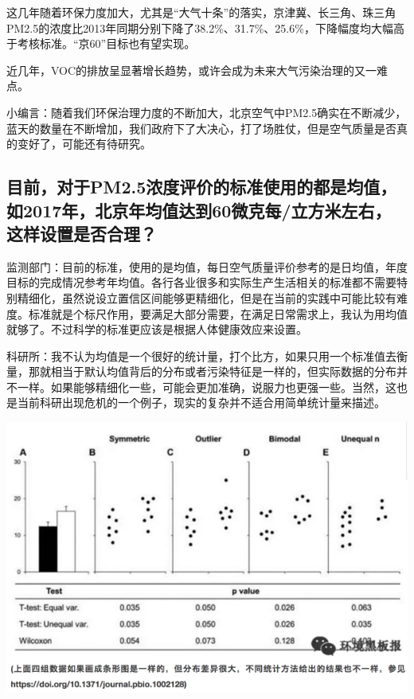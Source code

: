 \documentclass[]{book}
\begin{document}
这几年随着环保力度加大，尤其是``大气十条''的落实，京津冀、长三角、珠三角PM2.5的浓度比2013年同期分别下降了38.2\%、31.7\%、25.6\%，下降幅度均大幅高于考核标准。``京60''目标也有望实现。

近几年，VOC的排放呈显著增长趋势，或许会成为未来大气污染治理的又一难点。

小编言：随着我们环保治理力度的不断加大，北京空气中PM2.5确实在不断减少，蓝天的数量在不断增加，我们政府下了大决心，打了场胜仗，但是空气质量是否真的变好了，可能还有待研究。

\hypertarget{ux76eeux524dux5bf9ux4e8epm2.5ux6d53ux5ea6ux8bc4ux4ef7ux7684ux6807ux51c6ux4f7fux7528ux7684ux90fdux662fux5747ux503cux59822017ux5e74ux5317ux4eacux5e74ux5747ux503cux8fbeux523060ux5faeux514bux6bcfux7acbux65b9ux7c73ux5de6ux53f3ux8fd9ux6837ux8bbeux7f6eux662fux5426ux5408ux7406}{%
\subsection{目前，对于PM2.5浓度评价的标准使用的都是均值，如2017年，北京年均值达到60微克每/立方米左右，这样设置是否合理？}\label{ux76eeux524dux5bf9ux4e8epm2.5ux6d53ux5ea6ux8bc4ux4ef7ux7684ux6807ux51c6ux4f7fux7528ux7684ux90fdux662fux5747ux503cux59822017ux5e74ux5317ux4eacux5e74ux5747ux503cux8fbeux523060ux5faeux514bux6bcfux7acbux65b9ux7c73ux5de6ux53f3ux8fd9ux6837ux8bbeux7f6eux662fux5426ux5408ux7406}}

监测部门：目前的标准，使用的是均值，每日空气质量评价参考的是日均值，年度目标的完成情况参考年均值。各行各业很多和实际生产生活相关的标准都不需要特别精细化，虽然说设立置信区间能够更精细化，但是在当前的实践中可能比较有难度。标准就是个标尺作用，要满足大部分需要，在满足日常需求上，我认为用均值就够了。不过科学的标准更应该是根据人体健康效应来设置。

科研所：我不认为均值是一个很好的统计量，打个比方，如果只用一个标准值去衡量，那就相当于默认均值背后的分布或者污染特征是一样的，但实际数据的分布并不一样。如果能够精细化一些，可能会更加准确，说服力也更强一些。当然，这也是当前科研出现危机的一个例子，现实的复杂并不适合用简单统计量来描述。

\includegraphics[width=8.33in]{images/air3}
\end{document}
